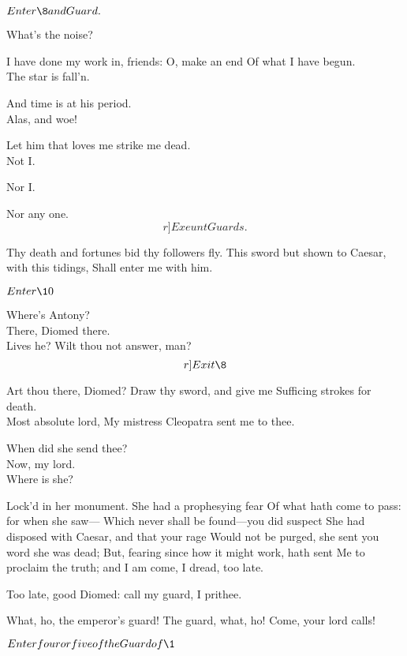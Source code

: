 \documentclass{book}
\begin{document}
	\(Enter \8 and Guard.\)

	What's the noise?

\1	I have done my work in, friends: O, make an end
	Of what I have begun. \\

	The star is fall'n.

	And time is at his period. \\

	Alas, and woe!

\1	Let him that loves me strike me dead. \\

	Not I.

	Nor I.

	Nor any one. 	\[r]Exeunt Guards.\]

\8	Thy death and fortunes bid thy followers fly.
	This sword but shown to Caesar, with this tidings,
	Shall enter me with him.


	\(Enter \10\)

	Where's Antony? \\

\8	                  There, Diomed there. \\

	Lives he?
	Wilt thou not answer, man?  \[r]Exit \8\]

\1	Art thou there, Diomed? Draw thy sword, and give me
	Sufficing strokes for death. \\

	Most absolute lord,
	My mistress Cleopatra sent me to thee.

\1	When did she send thee? \\

	Now, my lord. \\

\1	Where is she?

	Lock'd in her monument. She had a prophesying fear
	Of what hath come to pass: for when she saw---
	Which never shall be found---you did suspect
	She had disposed with Caesar, and that your rage
	Would not be purged, she sent you word she was dead;
	But, fearing since how it might work, hath sent
	Me to proclaim the truth; and I am come,
	I dread, too late.

\1	Too late, good Diomed: call my guard, I prithee.

	What, ho, the emperor's guard! The guard, what, ho!
	Come, your lord calls!

	\(Enter four or five of the Guard of \1\)
\end{document}
